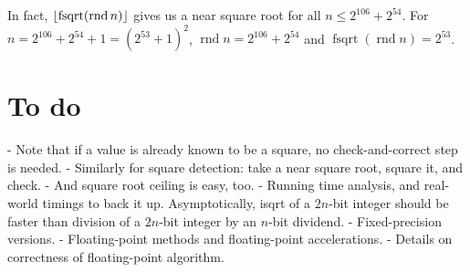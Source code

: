 \documentclass[a4paper]{article}
\DeclarePairedDelimiter\floor{\lfloor}{\rfloor}
\DeclareMathOperator{\rnd}{rnd}
\DeclareMathOperator{\fsqrt}{fsqrt}
\theoremstyle{plain}
\theoremstyle{definition}
\begin{document}
In fact, $\floor{\fsqrt(\rnd n)}$ gives us a near square root for all
$n \le 2^{106} + 2^{54}$. For $n = 2^{106} + 2^{54} + 1 = (2^{53} + 1)^2$,
$\rnd n = 2^{106} + 2^{54}$ and $\fsqrt(\rnd n) = 2^{53}$.

\section{To do}

- Note that if a value is already known to be a square, no check-and-correct
step is needed.
- Similarly for square detection: take a near square root, square it, and check.
- And square root ceiling is easy, too.
- Running time analysis, and real-world timings to back it up. Asymptotically,
isqrt of a $2n$-bit integer should be faster than division of a $2n$-bit integer
by an $n$-bit dividend.
- Fixed-precision versions.
- Floating-point methods and floating-point accelerations.
- Details on correctness of floating-point algorithm.
\end{document}
